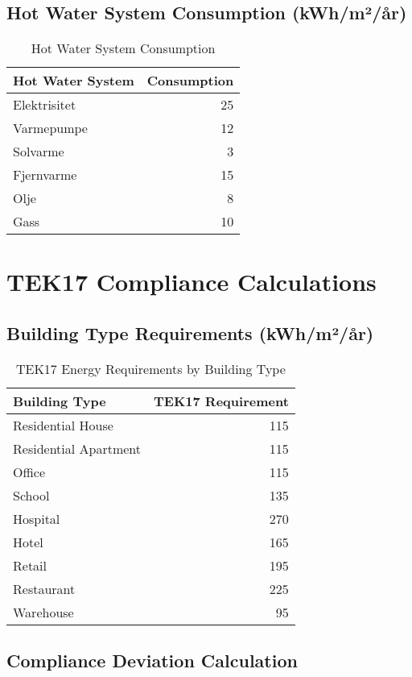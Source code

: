 \documentclass[12pt,a4paper]{article}
\begin{document}
\subsection{Hot Water System Consumption (kWh/m²/år)}

\begin{table}[H]
\centering
\begin{tabular}{|l|r|}
\hline
\textbf{Hot Water System} & \textbf{Consumption} \\
\hline
Elektrisitet & 25 \\
Varmepumpe & 12 \\
Solvarme & 3 \\
Fjernvarme & 15 \\
Olje & 8 \\
Gass & 10 \\
\hline
\end{tabular}
\caption{Hot Water System Consumption}
\end{table}

\section{TEK17 Compliance Calculations}

\subsection{Building Type Requirements (kWh/m²/år)}

\begin{table}[H]
\centering
\begin{tabular}{|l|r|}
\hline
\textbf{Building Type} & \textbf{TEK17 Requirement} \\
\hline
Residential House & 115 \\
Residential Apartment & 115 \\
Office & 115 \\
School & 135 \\
Hospital & 270 \\
Hotel & 165 \\
Retail & 195 \\
Restaurant & 225 \\
Warehouse & 95 \\
\hline
\end{tabular}
\caption{TEK17 Energy Requirements by Building Type}
\end{table}

\subsection{Compliance Deviation Calculation}
\end{document}
